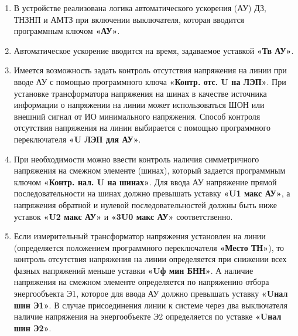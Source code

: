 
\color{black}

\begin{enumerate}[label=\arabic{section}.\arabic{subsection}.\arabic{enumi}, labelsep=4pt, leftmargin=0pt, itemindent=57pt, itemsep=0pt, parsep=0pt] %

\item
В устройстве реализована логика автоматического ускорения (АУ) ДЗ, ТНЗНП и АМТЗ при включении выключателя, которая вводится программным ключом \textbf{«АУ»}.

\item
Автоматическое ускорение вводится на время, задаваемое уставкой \textbf{«Тв АУ»}.

\item
Имеется возможность задать контроль отсутствия напряжения на линии при вводе АУ с помощью программного ключа \textbf{«Контр. отс. U на ЛЭП»}. При установке трансформатора напряжения на шинах в качестве источника информации о напряжении на линии может использоваться ШОН или внешний сигнал от ИО минимального напряжения. Способ контроля отсутствия напряжения на линии выбирается с помощью программного переключателя \textbf{«U ЛЭП для АУ»}.

\item
При необходимости можно ввести контроль наличия симметричного напряжения на смежном элементе (шинах), который задается программным ключом \textbf{«Контр. нал. U на шинах»}. Для ввода АУ напряжение прямой последовательности на шинах должно превышать уставку \textbf{«U1 макс АУ»}, а напряжения обратной и нулевой последовательностей должны быть ниже уставок \textbf{«U2 макс АУ»} и \textbf{«3U0 макс АУ»} соответственно.

\item
Если измерительный трансформатор напряжения установлен на линии (определяется положением программного переключателя \textbf{«Место ТН»}), то контроль отсутствия напряжения на линии определяется при снижении всех фазных напряжений меньше уставки \textbf{«Uф мин БНН»}. А наличие напряжения на смежном элементе определяется по напряжению отбора энергообъекта Э1, которое для ввода АУ должно превышать уставку \textbf{«Uнал шин Э1»}. В случае присоединения линии к системе через два выключателя наличие напряжения на энергообъекте Э2 определяется по уставке \textbf{«Uнал шин Э2»}.


\end{enumerate}
